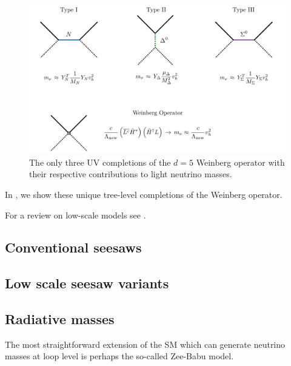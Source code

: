 \begin{figure}[t]
\centering
\includegraphics[width=\textwidth]{seesaw_mechanisms.pdf}
\caption[The tree-level UV completions of the Weinberg operator.]{The only three UV completions of the $d=5$ Weinberg operator with their respective contributions to light neutrino masses.\label{fig:seesaw_mechanisms}}
\end{figure}


In , we show these unique tree-level completions of the Weinberg operator.

For a review on low-scale models see \cite{Boucenna:2014zba}.

\subsection{Conventional seesaws}

\subsection{Low scale seesaw variants}

\subsection{Radiative masses}

The most straightforward extension of the SM which can generate neutrino masses at loop level is perhaps the so-called Zee-Babu model.